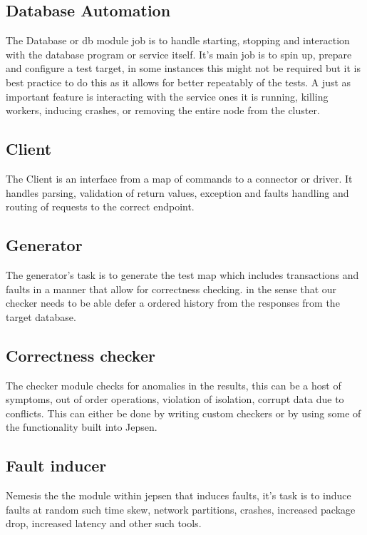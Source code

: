 \documentclass[a4paper,10pt,titlepage]{report}
\begin{document}
\subsection{Database Automation}
 The Database or db module job is to handle starting, stopping and interaction with the database program or service itself. It's main job is to spin up, prepare and configure a test target, in some instances this might not be required but it is best practice to do this as it allows for better repeatably of the tests. A just as important feature is interacting with the service ones it is running, killing workers, inducing crashes, or removing the entire node from the cluster.

\subsection{Client}
The Client is an interface from a map of commands to a connector or driver. It handles parsing, validation of return values, exception and faults handling and routing of requests to the correct endpoint.

\subsection{Generator}
The generator's task is to generate the test map which includes transactions and faults in a manner that allow for correctness checking. in the sense that our checker needs to be able defer a ordered history from the responses from the target database.

\subsection{Correctness checker}
The checker module checks for anomalies in the results, this can be a host of symptoms, out of order operations, violation of isolation, corrupt data due to conflicts. This can either be done by writing custom checkers or by using some of the functionality built into Jepsen.

\subsection{Fault inducer}
Nemesis the the module within jepsen that induces faults, it's task is to induce faults at random such time skew, network partitions, crashes, increased package drop, increased latency and other such tools.
\end{document}
